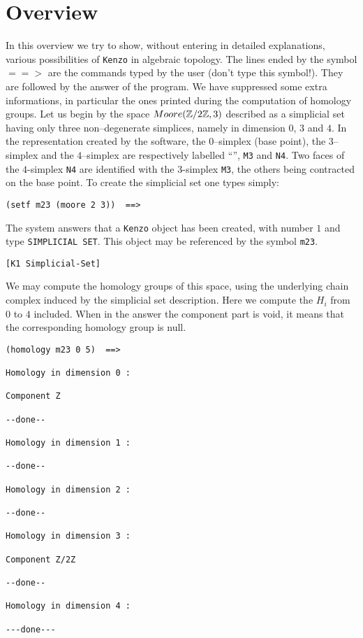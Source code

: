 \setcounter{chapter}{-1}
\chapter {Overview}

In this overview we try to  show, without entering in detailed
explanations, various possibilities of {\tt Kenzo} in algebraic topology.
The lines ended by the symbol $==>$ are the commands typed by the user
(don't type this symbol!).
They are followed by the answer of the program. We have suppressed some
extra informations, in particular the ones printed during the computation
of homology groups.
\vskip 0.5cm
Let us begin by the space $Moore({\mathbb{Z}}/2{\mathbb{Z}}, 3)$ described as a simplicial set
having only three non--degenerate simplices, namely in dimension
$0$, $3$ and $4$. In the  representation created by the software, the $0$--simplex (base point),
the $3$--simplex and the $4$--simplex are respectively labelled
``{\tt *}'', {\tt M3} and {\tt N4}. Two faces of the $4$-simplex {\tt N4} are identified with the
$3$-simplex {\tt M3}, the others being contracted on the base point. To create the simplicial set
one types simply:
{\footnotesize\begin{verbatim}
(setf m23 (moore 2 3))  ==>
\end{verbatim}}
The system answers that a {\tt Kenzo} object has been created, with number $1$ and
type {\tt SIMPLICIAL SET}. This object may be referenced  by the symbol {\tt m23}.
{\footnotesize\begin{verbatim}
[K1 Simplicial-Set]
\end{verbatim}}
We may compute the homology groups of this space, using the underlying chain complex
induced by the simplicial set description. Here we compute the $ H_i$ from $0$ to $4$ included.
When in the answer the component part is void, it means that the corresponding homology group is null.
{\footnotesize\begin{verbatim}
(homology m23 0 5)  ==>

Homology in dimension 0 :

Component Z

--done--

Homology in dimension 1 :

--done--

Homology in dimension 2 :

--done--

Homology in dimension 3 :

Component Z/2Z

--done--

Homology in dimension 4 :

---done---
\end{verbatim}}
